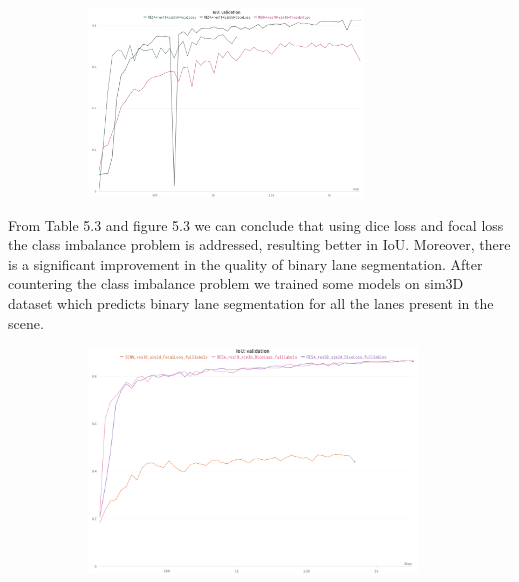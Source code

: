      \begin{figure}[h]
       \caption{IoU for binary lane segmentation trained on sim3D dataset\cite{guo2020gen} with cross entropy, dice and focal loss.}
        \centering
        \begin{subfigure}{0.6\textwidth}
        \includegraphics[width=1\linewidth, height=5cm]{images/binseg_IOU.png} 
        \label{fig:subim1}
        \end{subfigure}
        \end{figure}
    
    From Table 5.3 and figure 5.3 we can conclude that using dice loss and focal loss the class imbalance problem is addressed, resulting better in IoU. Moreover, there is a significant improvement in the quality of binary lane segmentation.
        After countering the class imbalance problem we trained some models on sim3D dataset which predicts binary lane segmentation for all the lanes present in the scene.
        
        \begin{figure}[h]
       \caption{IoU for binary lane segmentation trained on sim3D dataset with cross entropy, dice and focal loss.}
        \centering
        \begin{subfigure}{0.6\textwidth}
        \includegraphics[width=1\linewidth, height=6cm]{images/IOU_full.png} 
        \label{fig:subim1}
        \end{subfigure}
        \end{figure}
           
